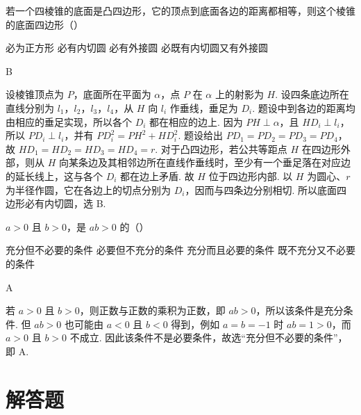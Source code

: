 \begin{problem}

若一个四棱锥的底面是凸四边形，它的顶点到底面各边的距离都相等，则这个棱锥的底面四边形（\quad）

\choices
    {必为正方形}
    {必有内切圆}
    {必有外接圆}
    {必既有内切圆又有外接圆}

\begin{answer}
B
\end{answer}

\begin{solution}
设棱锥顶点为 \(P\)，底面所在平面为 \(\alpha\)，点 \(P\) 在 \(\alpha\) 上的射影为 \(H\). 设四条底边所在直线分别为 \(l_1\)，\(l_2\)，\(l_3\)，\(l_4\)，从 \(H\) 向 \(l_i\) 作垂线，垂足为 \(D_i\). 题设中到各边的距离均由相应的垂足实现，所以各个 \(D_i\) 都在相应的边上. 因为 \(PH\perp\alpha\)，且 \(HD_i\perp l_i\)，所以 \(PD_i\perp l_i\)，并有 \(PD_i^2=PH^2+HD_i^2\). 题设给出 \(PD_1=PD_2=PD_3=PD_4\)，故 \(HD_1=HD_2=HD_3=HD_4=r\). 对于凸四边形，若公共等距点 \(H\) 在四边形外部，则从 \(H\) 向某条边及其相邻边所在直线作垂线时，至少有一个垂足落在对应边的延长线上，这与各个 \(D_i\) 都在边上矛盾. 故 \(H\) 位于四边形内部. 以 \(H\) 为圆心、\(r\) 为半径作圆，它在各边上的切点分别为 \(D_i\)，因而与四条边分别相切. 所以底面四边形必有内切圆，选 B.
\end{solution}
\end{problem}

\begin{problem}

\(a>0\) 且 \(b>0\)，是 \(ab>0\) 的（\quad）

\choices
    {充分但不必要的条件}
    {必要但不充分的条件}
    {充分而且必要的条件}
    {既不充分又不必要的条件}

\begin{answer}
A
\end{answer}

\begin{solution}
若 \(a>0\) 且 \(b>0\)，则正数与正数的乘积为正数，即 \(ab>0\)，所以该条件是充分条件. 但 \(ab>0\) 也可能由 \(a<0\) 且 \(b<0\) 得到，例如 \(a=b=-1\) 时 \(ab=1>0\)，而 \(a>0\) 且 \(b>0\) 不成立. 因此该条件不是必要条件，故选“充分但不必要的条件”，即 A.
\end{solution}
\end{problem}

\section{解答题}

